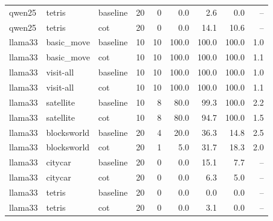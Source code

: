 \begin{tabular}{lllrrrrrr}
qwen25 & tetris & baseline & 20 & 0 & 0.0 & 2.6 & 0.0 & -- \\
qwen25 & tetris & cot & 20 & 0 & 0.0 & 14.1 & 10.6 & -- \\
llama33 & basic\_move & baseline & 10 & 10 & 100.0 & 100.0 & 100.0 & 1.0 \\
llama33 & basic\_move & cot & 10 & 10 & 100.0 & 100.0 & 100.0 & 1.1 \\
llama33 & visit-all & baseline & 10 & 10 & 100.0 & 100.0 & 100.0 & 1.0 \\
llama33 & visit-all & cot & 10 & 10 & 100.0 & 100.0 & 100.0 & 1.1 \\
llama33 & satellite & baseline & 10 & 8 & 80.0 & 99.3 & 100.0 & 2.2 \\
llama33 & satellite & cot & 10 & 8 & 80.0 & 94.7 & 100.0 & 1.5 \\
llama33 & blocksworld & baseline & 20 & 4 & 20.0 & 36.3 & 14.8 & 2.5 \\
llama33 & blocksworld & cot & 20 & 1 & 5.0 & 31.7 & 18.3 & 2.0 \\
llama33 & citycar & baseline & 20 & 0 & 0.0 & 15.1 & 7.7 & -- \\
llama33 & citycar & cot & 20 & 0 & 0.0 & 6.3 & 5.0 & -- \\
llama33 & tetris & baseline & 20 & 0 & 0.0 & 0.0 & 0.0 & -- \\
llama33 & tetris & cot & 20 & 0 & 0.0 & 3.1 & 0.0 & -- \\
\bottomrule
\end{tabular}

